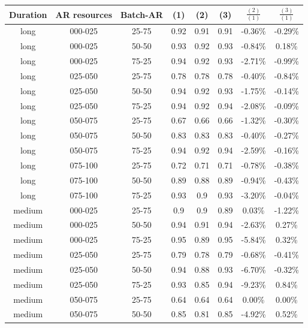 \begin{table}
\begin{center}
\begin{tabular}{|c|c|c|c|c|c|c|c|}
\hline
\textbf{Duration} & \textbf{AR resources} & \textbf{Batch-AR} & \textbf{(1)} & \textbf{(2)} & \textbf{(3)} &  \textbf{$\frac{(2)}{(1)}$} & \textbf{$\frac{(3)}{(1)}$}
\\\hline
long & 000-025 & 25-75 & 0.92 & 0.91 & 0.91 & -0.36\% & -0.29\%
\\\hline
long & 000-025 & 50-50 & 0.93 & 0.92 & 0.93 & -0.84\% & 0.18\%
\\\hline
long & 000-025 & 75-25 & 0.94 & 0.92 & 0.93 & -2.71\% & -0.99\%
\\\hline
long & 025-050 & 25-75 & 0.78 & 0.78 & 0.78 & -0.40\% & -0.84\%
\\\hline
long & 025-050 & 50-50 & 0.94 & 0.92 & 0.93 & -1.75\% & -0.14\%
\\\hline
long & 025-050 & 75-25 & 0.94 & 0.92 & 0.94 & -2.08\% & -0.09\%
\\\hline
long & 050-075 & 25-75 & 0.67 & 0.66 & 0.66 & -1.32\% & -0.30\%
\\\hline
long & 050-075 & 50-50 & 0.83 & 0.83 & 0.83 & -0.40\% & -0.27\%
\\\hline
long & 050-075 & 75-25 & 0.94 & 0.92 & 0.94 & -2.59\% & -0.16\%
\\\hline
long & 075-100 & 25-75 & 0.72 & 0.71 & 0.71 & -0.78\% & -0.38\%
\\\hline
long & 075-100 & 50-50 & 0.89 & 0.88 & 0.89 & -0.94\% & -0.43\%
\\\hline
long & 075-100 & 75-25 & 0.93 & 0.9 & 0.93 & -3.20\% & -0.04\%
\\\hline
medium & 000-025 & 25-75 & 0.9 & 0.9 & 0.89 & 0.03\% & -1.22\%
\\\hline
medium & 000-025 & 50-50 & 0.94 & 0.91 & 0.94 & -2.63\% & 0.27\%
\\\hline
medium & 000-025 & 75-25 & 0.95 & 0.89 & 0.95 & -5.84\% & 0.32\%
\\\hline
medium & 025-050 & 25-75 & 0.79 & 0.78 & 0.79 & -0.68\% & -0.41\%
\\\hline
medium & 025-050 & 50-50 & 0.94 & 0.88 & 0.93 & -6.70\% & -0.32\%
\\\hline
medium & 025-050 & 75-25 & 0.93 & 0.85 & 0.94 & -9.23\% & 0.84\%
\\\hline
medium & 050-075 & 25-75 & 0.64 & 0.64 & 0.64 & 0.00\% & 0.00\%
\\\hline
medium & 050-075 & 50-50 & 0.85 & 0.81 & 0.85 & -4.92\% & 0.52\%

\end{tabular}
\end{center}
\end{table}
